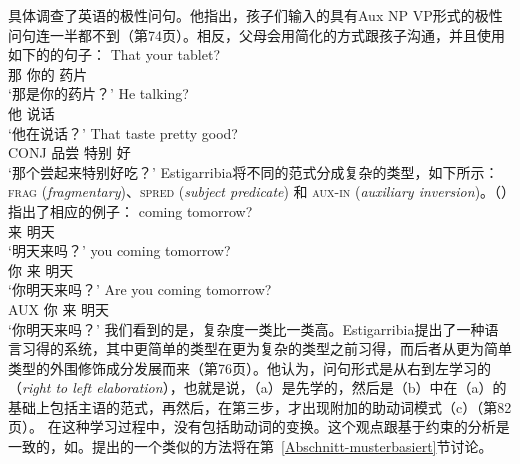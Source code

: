 \citet{Estigarribia2009a}具体调查了英语的极性问句。他指出，孩子们输入的具有Aux NP VP形式的极性问句连一半都不到（第74页）。相反，父母会用简化的方式跟孩子沟通，并且使用如下的的句子：
\eal
\ex 
\gll That your tablet?\\
那 你的 药片\\
\glt `那是你的药片？'
\ex 
\gll He talking?\\
他 说话\\
\glt `他在说话？'
\ex 
\gll That taste pretty good?\\
CONJ 品尝 特别 好\\
\glt `那个尝起来特别好吃？'
\zl
Estigarribia将不同的范式分成复杂的类型，如下所示：
\textsc{frag}
(\emph{fragmentary})、\textsc{spred} (\emph{subject predicate}) 和 \textsc{aux-in} (\emph{auxiliary
  inversion})。（）指出了相应的例子：
\eal\settowidth{}
\ex 
\gll coming tomorrow?         \\
来 明天\\
\glt `明天来吗？'
\ex 
\gll you coming tomorrow?     \\
你 来 明天\\
\glt `你明天来吗？'
\ex 
\gll Are you coming tomorrow? \\
AUX 你 来 明天\\
\glt `你明天来吗？'
\zl
我们看到的是，复杂度一类比一类高。Estigarribia提出了一种语言习得的系统，其中更简单的类型在更为复杂的类型之前习得，而后者从更为简单类型的外围修饰成分发展而来（第76页）。他认为，问句形式是从右到左学习的（\emph{right to left elaboration}），也就是说，（a）是先学的，然后是（b）中在（a）的基础上包括主语的范式，再然后，在第三步，才出现附加的助动词模式（c）（第82页）。
在这种学习过程中，没有包括助动词的变换。这个观点跟基于约束的分析是一致的，如\citet{GSag2000a-u}。\citet*{FPAG2007a}提出的一个类似的方法将在第~\ref{Abschnitt-musterbasiert}节讨论。
